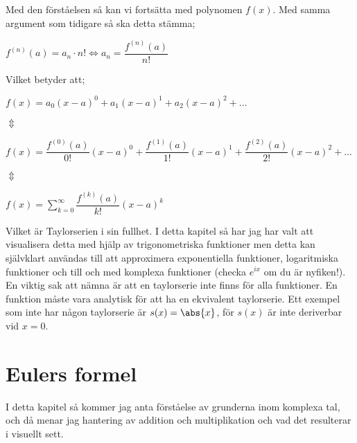 \documentclass[10pt, a4paper]{amsart}
\begin{document}
Med den förståelsen så kan vi fortsätta med polynomen $ f(x) $. Med samma argument som tidigare så ska detta stämma;
\vspace{24pt plus 4pt minus 4pt}

\bigskip
\hspace{5ex}
$ f^{(n)}(a) = a_n \cdot n! \iff a_n = \dfrac{f^{(n)}(a)}{n!} $ 
\vspace{24pt plus 4pt minus 4pt}

Vilket betyder att;
\vspace{24pt plus 4pt minus 4pt}

\hspace{5ex}
$ f(x) = a_0(x-a)^0 + a_1(x-a)^1 + a_2(x-a)^2 + \dotso $
\bigskip 

\hspace{10ex}
$ \Updownarrow $
\bigskip

\hspace{5ex}
$ f(x) = \dfrac{f^{(0)}(a)}{0!}(x-a)^0 + \dfrac{f^{(1)}(a)}{1!}(x-a)^1 + \dfrac{f^{(2)}(a)}{2!}(x-a)^2 + \dotso $
\bigskip

\hspace{10ex}
$ \Updownarrow $
\bigskip

\hspace{5ex}
$ f(x) = \sum\limits_{k=0}^{\infty} \dfrac{f^{(k)}(a)}{k!}(x-a)^k $ 
\vspace{24pt plus 4pt minus 4pt}

Vilket är Taylorserien i sin fullhet. I detta kapitel så har jag har valt att visualisera detta med hjälp av trigonometriska funktioner men detta kan självklart användas till att approximera exponentiella funktioner, logaritmiska funktioner och till och med komplexa funktioner (checka $ e^{ix} $ om du är nyfiken!).
En viktig sak att nämna är att en taylorserie inte finns för alla funktioner. En funktion måste vara analytisk för att ha en ekvivalent taylorserie. 
Ett exempel som inte har någon taylorserie är $ s(x) = \abs{x} $, för $ s(x) $ är inte deriverbar vid $ x = 0 $.

\newpage
\section{Eulers formel}
\bigskip

I detta kapitel så kommer jag anta förståelse av grunderna inom komplexa tal, och då menar jag hantering av addition och multiplikation och vad det resulterar i visuellt sett.
\bigskip
\end{document}
